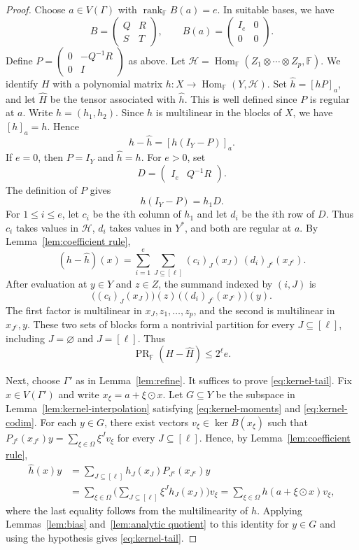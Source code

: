 \documentclass[11pt,reqno]{amsart}
\theoremstyle{plain}
\theoremstyle{definition}
\newcommand{\F}{\mathbb F}
\DeclareMathOperator{\Hom}{Hom}
\DeclareMathOperator{\prank}{PR}
\DeclareMathOperator{\rk}{rank}
\begin{document}
\begin{proof}
Choose $a\in V(\Gamma)$ with $\rk_{\F}B(a)=e$. In suitable bases, we have
\[
 B=\begin{pmatrix}Q&R\\S&T\end{pmatrix},\qquad
 B(a)=\begin{pmatrix}I_e&0\\0&0\end{pmatrix}.
\]
Define $P=\begin{pmatrix}0&-Q^{-1}R\\0&I\end{pmatrix}$ as above. Let $\mathcal H=\Hom_\F(Z_1\otimes\cdots\otimes Z_p,\F)$. We identify $H$ with a polynomial matrix $h\colon X\to\Hom_\F(Y,\mathcal H)$. Set $\widehat h=[hP]_a$, and let $\widehat H$ be the tensor associated with $\widehat h$. This is well defined since $P$ is regular at $a$. Write $h=(h_1,h_2)$. Since $h$ is multilinear in the blocks of $X$,
we have $[h]_a=h$. Hence
\[
 h-\widehat h=[h(I_Y-P)]_a.
\]
If $e=0$, then $P=I_Y$ and $\widehat h=h$. For $e>0$, set
\[
 D=\begin{pmatrix}I_e&Q^{-1}R\end{pmatrix}.
\]
The definition of $P$ gives
\[
 h(I_Y-P)=h_1D.
\]
For $1\leq i\leq e$, let $c_i$ be the $i$th column of $h_1$ and
let $d_i$ be the $i$th row of $D$. Thus $c_i$ takes values in
$\mathcal H$, $d_i$ takes values in $Y^*$, and both are regular at $a$.
By Lemma~\ref{lem:coefficient rule},
\[
 (h-\widehat h)(x)
 =\sum_{i=1}^e\sum_{J\subseteq[\ell]}
   (c_i)_J(x_J)\,(d_i)_{J^c}(x_{J^c}).
\]
After evaluation at $y\in Y$ and $z\in Z$, the summand indexed by
$(i,J)$ is
\[
 \bigl((c_i)_J(x_J)\bigr)(z)\,
 \bigl((d_i)_{J^c}(x_{J^c})\bigr)(y).
\]
The first factor is multilinear in $x_J,z_1,\ldots,z_p$, and the
second is multilinear in $x_{J^c},y$. These two sets of blocks form
a nontrivial partition for every $J\subseteq[\ell]$, including
$J=\varnothing$ and $J=[\ell]$. Thus
\[
 \prank_{\F}(H-\widehat H)\leq 2^\ell e.
\]

Next, choose $\Gamma'$ as in Lemma~\ref{lem:refine}. It suffices to prove \eqref{eq:kernel-tail}. Fix $x\in V(\Gamma')$ and write $x_\xi=a+\xi\odot x$. Let $G\subseteq Y$ be the subspace in Lemma~\ref{lem:kernel-interpolation} satisfying \eqref{eq:kernel-moments} and \eqref{eq:kernel-codim}. For each $y\in G$, there exist vectors $v_\xi\in\ker B(x_\xi)$ such that $P_{J^c}(x_{J^c})y=\sum_{\xi\in\Omega}\xi^Jv_\xi$ for every $J\subseteq[\ell]$. Hence, by Lemma~\ref{lem:coefficient rule},
\begin{align*}
 \widehat h(x)y
 &=\sum_{J\subseteq[\ell]} h_J(x_J)P_{J^c}(x_{J^c})y\\
 &=\sum_{\xi\in\Omega}\biggl(\sum_{J\subseteq[\ell]}\xi^J h_J(x_J)\biggr)v_\xi
   =\sum_{\xi\in\Omega} h(a+\xi\odot x)v_\xi,
\end{align*}
where the last equality follows from the multilinearity of $h$. Applying Lemmas~\ref{lem:bias} and~\ref{lem:analytic quotient} to this identity for $y\in G$ and using the hypothesis gives \eqref{eq:kernel-tail}.
\end{proof}
\end{document}

